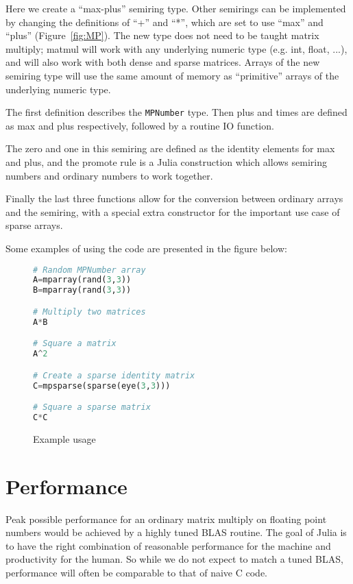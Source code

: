 \documentclass[conference]{IEEEtran}
\begin{document}
Here we create a ``max-plus'' semiring type.  Other semirings can be implemented
by changing the definitions of ``+'' and ``*'', which are set to use
``max'' and ``plus'' (Figure~\ref{fig:MP}).
The new type does not need to be taught matrix multiply; matmul will work with
any underlying numeric type (e.g. int, float, ...), and will also work with
both dense and sparse matrices. Arrays of the new semiring type will use the
same amount of memory as ``primitive'' arrays of the underlying numeric type.

The first definition describes the \verb+MPNumber+ type.
Then plus and times are defined as max and plus respectively, followed by
a routine IO function.

The zero and one in this semiring are defined as the identity elements for max and plus,
and the promote rule is a Julia construction which allows semiring numbers and ordinary
numbers to work together.

Finally the last three functions allow for the conversion between ordinary arrays and the semiring, with a special extra constructor for the important use case of sparse arrays.

Some examples of using the code are presented in the figure below:

\begin{figure}[h]
\begin{lstlisting}[language=python, frame=single]
# Random MPNumber array
A=mparray(rand(3,3)) 
B=mparray(rand(3,3))

# Multiply two matrices
A*B

# Square a matrix
A^2

# Create a sparse identity matrix
C=mpsparse(sparse(eye(3,3)))

# Square a sparse matrix
C*C
\end{lstlisting}
\label{fig:example}
\caption{Example usage}
\end{figure}

\section{Performance}

Peak possible performance for an ordinary matrix multiply on floating point numbers
would be achieved by a highly tuned BLAS routine.
The goal of Julia is to have the right combination of reasonable performance
for the machine and productivity for the human.  So while we do not expect to match
a tuned BLAS, performance will often be comparable to that of naive C code.
\end{document}
